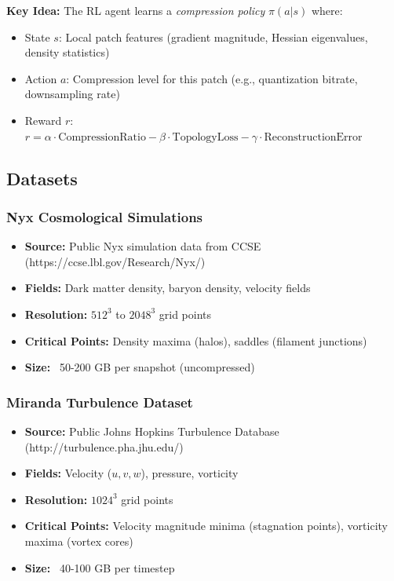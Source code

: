 \documentclass[11pt]{article}
\begin{document}
\textbf{Key Idea:} The RL agent learns a \textit{compression policy} $\pi(a | s)$ where:
\begin{itemize}
    \item State $s$: Local patch features (gradient magnitude, Hessian eigenvalues, density statistics)
    \item Action $a$: Compression level for this patch (e.g., quantization bitrate, downsampling rate)
    \item Reward $r$: $r = \alpha \cdot \text{CompressionRatio} - \beta \cdot \text{TopologyLoss} - \gamma \cdot \text{ReconstructionError}$
\end{itemize}

\subsection{Datasets}

\subsubsection{Nyx Cosmological Simulations}

\begin{itemize}
    \item \textbf{Source:} Public Nyx simulation data from CCSE (https://ccse.lbl.gov/Research/Nyx/)
    \item \textbf{Fields:} Dark matter density, baryon density, velocity fields
    \item \textbf{Resolution:} $512^3$ to $2048^3$ grid points
    \item \textbf{Critical Points:} Density maxima (halos), saddles (filament junctions)
    \item \textbf{Size:} ~50-200 GB per snapshot (uncompressed)
\end{itemize}

\subsubsection{Miranda Turbulence Dataset}

\begin{itemize}
    \item \textbf{Source:} Public Johns Hopkins Turbulence Database (http://turbulence.pha.jhu.edu/)
    \item \textbf{Fields:} Velocity ($u, v, w$), pressure, vorticity
    \item \textbf{Resolution:} $1024^3$ grid points
    \item \textbf{Critical Points:} Velocity magnitude minima (stagnation points), vorticity maxima (vortex cores)
    \item \textbf{Size:} ~40-100 GB per timestep
\end{itemize}
\end{document}
